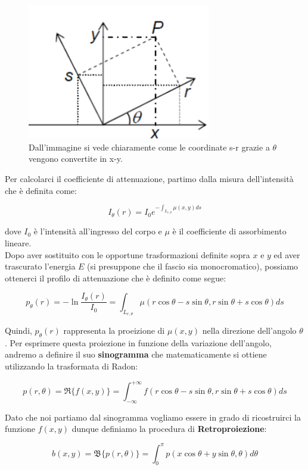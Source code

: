\begin{figure}[H]
    \centering
    \includegraphics[width=8cm, keepaspectratio]{capitoli/immagini/imgs/gantryref.png}
    \caption{Dall'immagine si vede chiaramente come le coordinate s-r grazie a $\theta$ vengono convertite in x-y.}
\end{figure}

Per calcolarci il coefficiente di attenuazione, partimo dalla misura dell'intensità
che è definita come:

$$
    I_\theta(r) = I_0 e^{-\int_{L_{r,\theta}} \mu(x,y) ds}
$$

dove $I_0$ è l'intensità all'ingresso del corpo e $\mu$ è il coefficiente di assorbimento lineare.\\

Dopo aver sostituito con le opportune trasformazioni definite sopra $x$ e $y$ ed aver
trascurato l'energia $E$ (si presuppone che il fascio sia monocromatico), possiamo
ottenerci il profilo di attenuazione che è definito come segue:

$$
    p_\theta(r) = -\ln \frac{I_\theta(r)}{I_0} = \int_{L_{r, \theta}} \mu(r \cos
    \theta - s \sin \theta, r \sin \theta + s \cos \theta) ds
$$

Quindi, $p_\theta(r)$ rappresenta la proeizione di $\mu(x,y)$ nella direzione
dell'angolo $\theta$. Per esprimere questa proiezione in funzione della variazione
dell'angolo, andremo a definire il suo \textbf{sinogramma} che matematicamente si
ottiene utilizzando la trasformata di Radon:

$$
    p(r, \theta) = \Re \{ f(x,y) \} = \int_{- \infty}^{+ \infty} f(r \cos \theta
    - s \sin \theta, r \sin \theta + s \cos \theta) ds
$$

Dato che noi partiamo dal sinogramma vogliamo essere in grado di ricostruirci la
funzione $f(x,y)$ dunque definiamo la procedura di \textbf{Retroproiezione}:

$$
    b(x,y) = \mathfrak{B} \{p(r, \theta)\} = \int_{0}^{\pi} p(x \cos \theta + y
    \sin \theta, \theta) d\theta
$$

